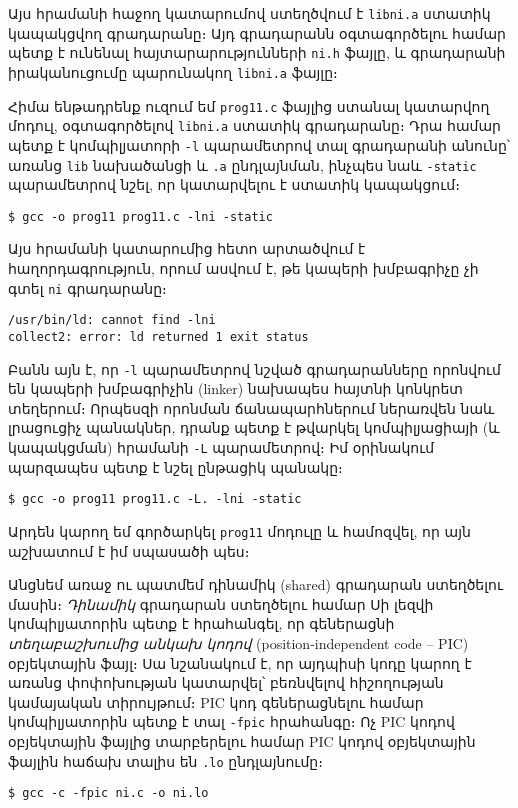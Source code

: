 Այս հրամանի հաջող կատարումով ստեղծվում է \texttt{libni.a}
ստատիկ կապակցվող գրադարանը։ Այդ գրադարանն օգտագործելու համար
պետք է ունենալ հայտարարությունների \texttt{ni.h} ֆայլը, և
գրադարանի իրականուցումը պարունակող \texttt{libni.a} ֆայլը։

Հիմա ենթադրենք ուզում եմ \texttt{prog11.c} ֆայլից ստանալ
կատարվող մոդուլ, օգտագործելով \texttt{libni.a} ստատիկ գրադարանը։
Դրա համար պետք է կոմպիլյատորի \Verb|-l| պարամետրով տալ գրադարանի
անունը՝ առանց \texttt{lib} նախածանցի և \Verb|.a| ընդլայնման,
ինչպես նաև \Verb|-static| պարամետրով նշել, որ կատարվելու է
ստատիկ կապակցում։

\begin{Verbatim}
$ gcc -o prog11 prog11.c -lni -static
\end{Verbatim}

Այս հրամանի կատարումից հետո արտածվում է հաղորդագրություն, որում
ասվում է, թե կապերի խմբագրիչը չի գտել \texttt{ni} գրադարանը։

\begin{Verbatim}
/usr/bin/ld: cannot find -lni
collect2: error: ld returned 1 exit status
\end{Verbatim}

Բանն այն է, որ \Verb|-l| պարամետրով նշված գրադարանները որոնվում
են կապերի խմբագրիչին (linker) նախապես հայտնի կոնկրետ տեղերում։
Որպեսզի որոնման ճանապարհներում ներառվեն նաև լրացուցիչ պանակներ,
դրանք պետք է թվարկել կոմպիլյացիայի (և կապակցման) հրամանի
\Verb|-L| պարամետրով։ Իմ օրինակում պարզապես պետք է նշել ընթացիկ
պանակը։

\begin{Verbatim}
$ gcc -o prog11 prog11.c -Լ. -lni -static
\end{Verbatim}

Արդեն կարող եմ գործարկել \texttt{prog11} մոդուլը և համոզվել,
որ այն աշխատում է իմ սպասածի պես։

\tristar

Անցնեմ առաջ ու պատմեմ դինամիկ (shared) գրադարան ստեղծելու մասին։
\emph{Դինամիկ} գրադարան ստեղծելու համար Սի լեզվի կոմպիլյատորին
պետք է հրահանգել, որ գեներացնի \emph{տեղաբաշխումից անկախ կոդով}
(position-independent code -- PIC) օբյեկտային ֆայլ։ Սա նշանակում
է, որ այդպիսի կոդը կարող է առանց փոփոխության կատարվել՝ բեռնվելով
հիշողության կամայական տիրույթում։ PIC կոդ գեներացնելու համար
կոմպիլյատորին պետք է տալ \Verb|-fpic| հրահանգը։ Ոչ PIC կոդով
օբյեկտային ֆայլից տարբերելու համար PIC կոդով օբյեկտային ֆայլին
հաճախ տալիս են \Verb|.lo| ընդլայնումը։

\begin{Verbatim}
$ gcc -c -fpic ni.c -o ni.lo
\end{Verbatim}

